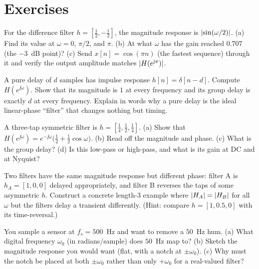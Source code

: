\section{Exercises}
\label{ch14:exercises}

\begin{exercise}
For the difference filter $h=[\tfrac12,-\tfrac12]$, the magnitude response is
$\lvert\sin(\omega/2)\rvert$. (a) Find its value at $\omega=0$, $\pi/2$, and $\pi$.
(b) At what $\omega$ has the gain reached $0.707$ (the $-3$~dB point)?
(c) Send $x[n]=\cos(\pi n)$ (the fastest sequence) through it and verify the
output amplitude matches $\lvert H(e^{\mathrm{j}\pi})\rvert$.
\end{exercise}

\begin{exercise}
A pure delay of $d$ samples has impulse response $h[n]=\delta[n-d]$. Compute
$H(e^{\jj\omega})$. Show that its magnitude is $1$ at every frequency and its
group delay is exactly $d$ at every frequency. Explain in words why a pure delay
is the ideal linear-phase ``filter'' that changes nothing but timing.
\end{exercise}

\begin{exercise}
A three-tap symmetric filter is $h=[\tfrac14,\tfrac12,\tfrac14]$. (a) Show that
$H(e^{\jj\omega}) = e^{-\jj\omega}\big(\tfrac12 + \tfrac12\cos\omega\big)$.
(b) Read off the magnitude and phase. (c) What is the group delay? (d) Is this
low-pass or high-pass, and what is its gain at DC and at Nyquist?
\end{exercise}

\begin{exercise}
Two filters have the same magnitude response but different phase: filter A is
$h_A=[1,0,0]$ delayed appropriately, and filter B reverses the taps of some
asymmetric $h$. Construct a concrete length-3 example where $\lvert H_A\rvert=\lvert H_B\rvert$
for all $\omega$ but the filters delay a transient differently. (Hint: compare
$h=[1, 0.5, 0]$ with its time-reversal.)
\end{exercise}

\begin{exercise}
You sample a sensor at $f_s = 500$~Hz and want to remove a $50$~Hz hum.
(a) What digital frequency $\omega_0$ (in radians/sample) does $50$~Hz map to?
(b) Sketch the magnitude response you would want (flat, with a notch at
$\pm\omega_0$). (c) Why must the notch be placed at both $\pm\omega_0$ rather than
only $+\omega_0$ for a real-valued filter?
\end{exercise}

